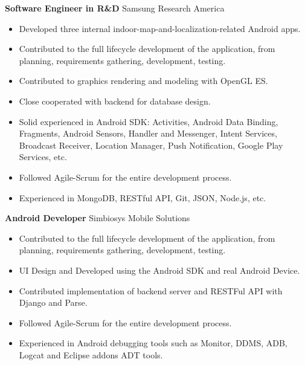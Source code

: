 \documentclass[10pt,letterpaper,sans]{moderncv}        %
\begin{document}
\vspace*{0.5cm}
{\textbf{Software Engineer in R\&D}}
{Samsung Research America}{}{}{
\begin{itemize}
\item Developed three internal indoor-map-and-localization-related Android apps.
\item Contributed to the full lifecycle development of the application, from planning, requirements gathering, development, testing.
\item Contributed to graphics rendering and modeling with OpenGL ES.
\item Close cooperated with backend for database design.
\item Solid experienced in Android SDK: Activities, Android Data Binding, Fragments, Android Sensors, Handler and Messenger, Intent Services, Broadcast Receiver, Location Manager, Push Notification, Google Play Services, etc.
\item Followed Agile-Scrum for the entire development process.
\item Experienced in MongoDB, RESTful API, Git, JSON, Node.js, etc.
\end{itemize}} 


\vspace*{0.5cm}
{\textbf{Android Developer}}
{Simbiosys Mobile Solutions}{}{}{
\begin{itemize}
\item Contributed to the full lifecycle development of the application, from planning, requirements gathering, development, testing.
\item UI Design and Developed using the Android SDK and real Android Device.
\item Contributed implementation of backend server and  RESTFul API  with Django and Parse.
\item Followed Agile-Scrum for the entire development process.
\item Experienced in Android debugging tools such as Monitor, DDMS, ADB, Logcat and Eclipse addons ADT tools.
\end{itemize}} 
\end{document}
